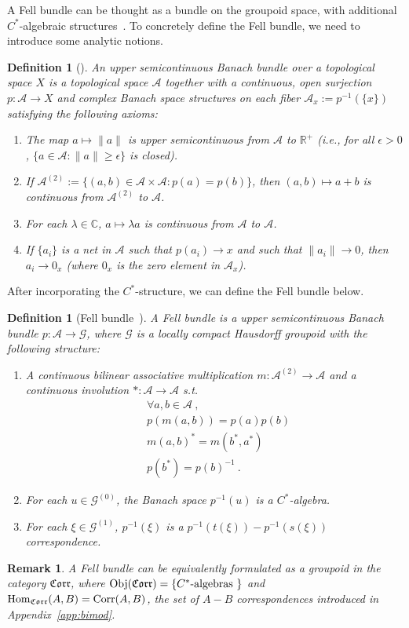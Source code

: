 \documentclass[a4paper,11pt]{article}
\newtheorem{defn}[lemma]{Definition}
\newtheorem{remark}[lemma]{Remark}
\newcommand{\be}{\begin{equation}}
\newcommand{\ee}{\end{equation}}
\newcommand{\ba}{\begin{aligned}}
\newcommand{\ea}{\end{aligned}}
\def\CA{\mathcal{A}}
\def\CG{\mathcal{G}}
\def\mfr{\mathfrak}
\def\calgs{$C^*$-algebras\ }
\begin{document}
A Fell bundle can be thought as a bundle on the groupoid space, with additional $C^*$-algebraic structures~\cite{Fell:1969eml,Kumjian:1998umx}. To concretely define the Fell bundle, we need to introduce some analytic notions.
\begin{defn}[\cite{Muhly:2008pdm}]
    An upper semicontinuous Banach bundle over a topological space $X$ is a topological space $\mathcal{A}$ together with a continuous, open surjection $p : \mathcal{A} \to X$ and complex Banach space structures on each fiber $\mathcal{A}_x := p^{-1}(\{x\})$ satisfying the following axioms:
    \begin{enumerate}
    \item The map $a \mapsto \|a\|$ is upper semicontinuous from $\mathcal{A}$ to $\mathbb{R}^+$ (i.e., for all $\epsilon > 0$, $\{ a \in \mathcal{A} : \|a\| \ge \epsilon \}$ is closed).
    \item If $\mathcal{A}^{(2)} := \{ (a,b) \in \mathcal{A} \times \mathcal{A} : p(a) = p(b) \}$, then $(a,b) \mapsto a + b$ is continuous from $\mathcal{A}^{(2)}$ to $\mathcal{A}$.
    \item For each $\lambda \in \mathbb{C}$, $a \mapsto \lambda a$ is continuous from $\mathcal{A}$ to $\mathcal{A}$.
    \item If $\{a_i\}$ is a net in $\mathcal{A}$ such that $p(a_i) \to x$ and such that $\|a_i\| \to 0$, then $a_i \to 0_x$ (where $0_x$ is the zero element in $\mathcal{A}_x$).
\end{enumerate}
\end{defn}
After incorporating the $C^*$-structure, we can define the Fell bundle below.

\begin{defn}[Fell bundle~\cite{Muhly:2008pdm}]
    A Fell bundle is a upper semicontinuous Banach bundle $p:\CA\to \CG$, where $\CG$ is a locally compact Hausdorff groupoid with the following structure:
    \begin{enumerate}
        \item A continuous bilinear associative multiplication $m:\CA^{(2)}\to \CA$ and a continuous involution $*:\CA\to \CA$ s.t.
        \be\ba  &\forall a,b\in \CA \ , \\ &p(m(a,b)) = p(a)p(b)  \\  &m(a,b)^* = m(b^*,a^*) \\ &p(b^*) = p(b)^{-1} \ .  \ea\ee
        \item For each $u\in \CG^{(0)}$, the Banach space $p^{-1}(u)$ is a $C^*$-algebra.
        \item For each $\xi \in \CG^{(1)}$, $p^{-1}(\xi)$ is a $p^{-1}(t(\xi) )-p^{-1}(s(\xi))$ correspondence.
    \end{enumerate}
\end{defn}
\begin{remark}
A Fell bundle can be equivalently formulated as a groupoid in the category $\mfr{Corr}$, where ${\rm Obj}(\mfr{Corr}) = \{\text{\calgs}\}$ and ${\rm Hom}_{\mfr{Corr}}(A,B) = {\rm Corr}(A,B)$, the set of $A-B$ correspondences introduced in Appendix~\ref{app:bimod}.
\end{remark}
\end{document}
